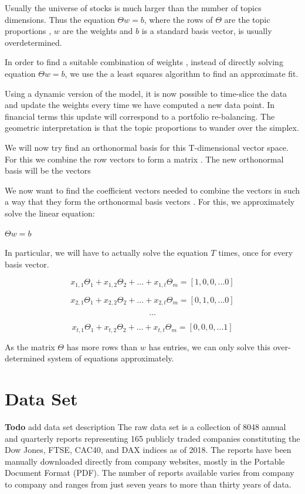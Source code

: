 \documentclass[12pt,journal,letterpaper,oneside,onecolumn]{IEEEtran}
\begin{document}
Usually the universe of stocks is much larger than the number of topics dimensions. Thus the equation $\Theta w = b$, where the rows of $\Theta$ are the topic proportions  , $w$ are the weights and $b$ is a standard basis vector, is usually overdetermined.

In order to find a suitable combination of weights , instead of directly solving equation $\Theta w = b$, we use the a least squares algorithm to find an approximate fit.

Using a dynamic version of the model, it is now possible to time-slice the data and update the weights every time we have computed a new data point. In financial terms this update will correspond to a portfolio re-balancing.
The geometric interpretation is that the topic proportions to wander over the simplex.

We will now try find an orthonormal basis for this T-dimensional vector space.
For this we combine the  row vectors to form a matrix .
The new orthonormal basis will be the vectors 

We now want to find the coefficient vectors  needed to combine the vectors in such a way that they form the orthonormal basis vectors .
For this, we approximately solve the linear equation:

$\Theta w = b$

In particular, we will have to actually solve the equation $T$ times, once for every basis vector.

$$x_{1,1} \Theta_1 + x_{1,2} \Theta_2 + ... + x_{1,t} \Theta_m = [1,0,0, ... 0] $$

$$x_{2,1} \Theta_1 + x_{2,2} \Theta_2 + ... + x_{2,t} \Theta_m = [0,1,0, ... 0] $$

$$ ... $$

$$x_{t,1} \Theta_1 + x_{t,2} \Theta_2 + ... + x_{t,t} \Theta_m = [0,0,0, ... 1] $$


As the matrix $\Theta$ has more rows than $w$ has entries, we can only solve this over-determined system of equations approximately.


\section{Data Set}

\textbf{Todo} add data set description
The raw data set is a collection of 8048 annual and quarterly reports representing 165 publicly traded companies constituting the Dow Jones, FTSE, CAC40, and DAX indices as of 2018. The reports have been manually downloaded directly from  company websites, mostly in the Portable Document Format (PDF). The number of reports available varies from company to company and ranges from just seven years to more than thirty years of data. 
\end{document}
